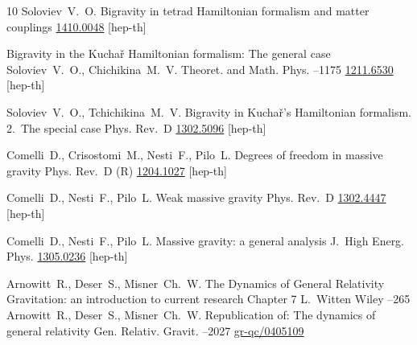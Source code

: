 \begin{thebibliography}{10}
\by Soloviev~V.~O.
\preprint Bigravity in tetrad Hamiltonian formalism and matter couplings
\preprintinfo \arxiv \href{http://arxiv.org/abs/1410.0048}{1410.0048} [hep-th] 



\paper Bigravity in the Kucha\v{r} Hamiltonian formalism: The general case
\by     Soloviev~V.~O.,  Chichikina~M.~V. 
\jour Theoret. and Math. Phys.
--1175
\arxiv \href{http://arxiv.org/abs/1211.6530}{1211.6530} [hep-th] 

\by  Soloviev~V.~O., Tchichikina~M.~V.
\paper Bigravity in Kucha\v{r}'s Hamiltonian formalism. 2.~The special case
\jour Phys. Rev.~D  
\arxiv \href{http://arxiv.org/abs/1302.5096}{1302.5096} [hep-th] 

\by Comelli~D., Crisostomi~M., Nesti~F., Pilo~L.
\paper  Degrees of freedom in massive gravity 
\jour  Phys. Rev.~D
(R) 
\arxiv \href{http://arxiv.org/abs/1204.1027}{1204.1027} [hep-th] 


\by Comelli~D., Nesti~F., Pilo~L.
\paper  Weak massive gravity 
\jour Phys. Rev.~D 
\arxiv \href{http://arxiv.org/abs/1302.4447}{1302.4447} [hep-th] 

\by Comelli~D., Nesti~F., Pilo~L.
\paper Massive gravity: a general analysis
\jour J.~High Energ. Phys. 
\arxiv \href{http://arxiv.org/abs/1305.0236}{1305.0236} [hep-th] 


\by Arnowitt~R., Deser~S., Misner~Ch.~W.
\paper The Dynamics of General Relativity
\inbook  Gravitation: an introduction to current research
\paperinfo Chapter 7
\ed L.~Witten 
\publ Wiley 
--265
\moreref
\by Arnowitt~R., Deser~S., Misner~Ch.~W.
\paper Republication of: The dynamics of general relativity
\jour Gen. Relativ. Gravit.
--2027 
\arxiv \href{http://arxiv.org/abs/gr-qc/0405109}{gr-qc/0405109}




\end{thebibliography}
